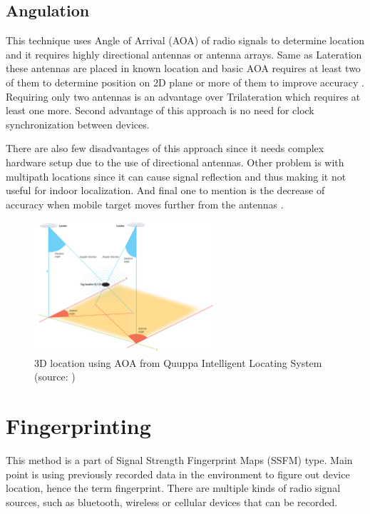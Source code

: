 \subsection{Angulation}\label{sec:Angulation}
This technique uses Angle of Arrival (AOA) of radio signals to determine location and it requires highly directional antennas or antenna arrays. Same as Lateration these antennas are placed in known location and basic AOA requires at least two of them to determine position on 2D plane or more of them to improve accuracy \cite{RAinWILTaS}. Requiring only two antennas is an advantage over Trilateration which requires at least one more. Second advantage of this approach is no need for clock synchronization between devices.

There are also few disadvantages of this approach since it needs complex hardware setup due to the use of directional antennas. Other problem is with multipath locations since it can cause signal reflection and thus making it not useful for indoor localization. And final one to mention is the decrease of accuracy when mobile target moves further from the antennas \cite{AoA, RofAoA}.

\begin{figure}[h!]
	\begin{centering}
		\includegraphics[width=0.6\textwidth]{img/angulation}
		\par\end{centering}
	\caption{3D location using AOA from Quuppa Intelligent Locating System (source: \cite{QAoA})\label{fig:AoAQuuppa}}
	\label{fig03c02}
\end{figure}

\section{Fingerprinting}\label{sec:Fingerprinting}
This method is a part of Signal Strength Fingerprint Maps (SSFM) type. Main point is using previously recorded data in the environment to figure out device location, hence the term fingerprint. There are multiple kinds of radio signal sources, such as bluetooth, wireless or cellular devices that can be recorded.

